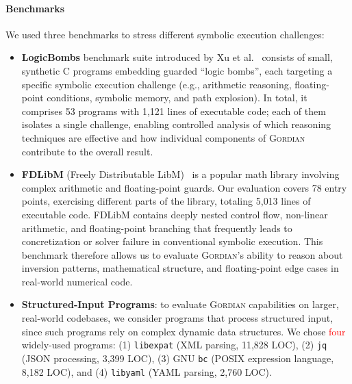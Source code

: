 \documentclass[acmsmall]{acmart}
\newcommand{\rev}[1]{\textcolor{red}{#1}}
\newcommand{\rev}[1]{#1}
\newenvironment{revblock}{\color{red}}{}
\newenvironment{revblock}{}{}
\newcommand{\projName}{\textsc{Gordian}\xspace}
\theoremstyle{definition}
\begin{document}
\paragraph*{Benchmarks} We used three benchmarks to stress different symbolic execution challenges:
\begin{itemize}
\item \textbf{LogicBombs} benchmark suite introduced by Xu et al.~\cite{xu2018benchmarking} consists of small, synthetic C programs embedding guarded ``logic bombs'', each targeting a specific symbolic execution challenge (e.g., arithmetic reasoning, floating-point conditions, symbolic memory, and path explosion). In total, it comprises 53 programs with 1{,}121 lines of executable code; each of them isolates a single challenge, enabling controlled analysis of which reasoning techniques are effective and how individual components of \textsc{\projName{}} contribute to the overall result.
\end{itemize}
\WFclear%
\begin{itemize}
\item \textbf{FDLibM} (Freely Distributable LibM)~\cite{fdlibm} is a popular math library involving complex arithmetic and floating-point guards. Our evaluation covers 78 entry points, exercising different parts of the library, totaling 5{,}013 lines of executable code. FDLibM contains deeply nested control flow, non-linear arithmetic, and floating-point branching that frequently leads to concretization or solver failure in conventional symbolic execution. This benchmark therefore allows us to evaluate \projName's ability to reason about inversion patterns, mathematical structure, and floating-point edge cases in real-world numerical code.
 \item \textbf{Structured-Input Programs}: to evaluate \projName capabilities on larger, real-world codebases, we consider programs that process structured input, since such programs rely on complex dynamic data structures. We chose \rev{four} widely-used programs: (1) \texttt{libexpat} (XML parsing, 11{,}828  LOC), (2) \texttt{jq} (JSON processing, 3{,}399  LOC), (3) GNU \texttt{bc} (POSIX expression language, 8{,}182  LOC), \begin{revblock} and (4)  \texttt{libyaml} (YAML parsing, 2{,}760  LOC).   \end{revblock}
\end{itemize}
\end{document}
